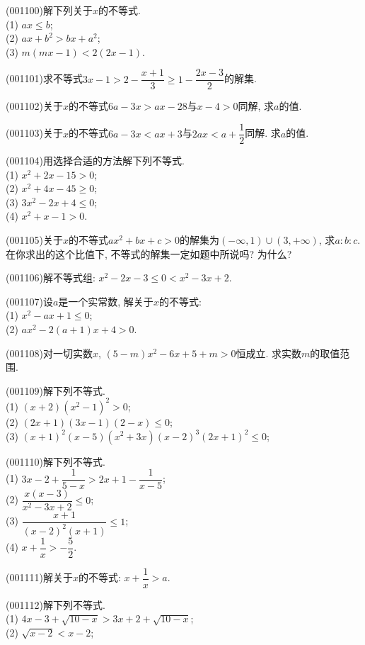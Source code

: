 \item (001100)解下列关于$x$的不等式.\\ 
(1) $ax\le b$;\\ 
(2) $ax+b^2>bx+a^2$;\\ 
(3) $m(mx-1)<2(2x-1)$.
\item (001101)求不等式$3x-1>2-\dfrac{x+1}{3}\ge 1-\dfrac{2x-3}{2}$的解集.
\item (001102)关于$x$的不等式$6a-3x>ax-28$与$x-4>0$同解, 求$a$的值.
\item (001103)关于$x$的不等式$6a-3x<ax+3$与$2ax<a+\dfrac{1}{2}$同解. 求$a$的值.
\item (001104)用选择合适的方法解下列不等式.\\ 
(1) $x^2+2x-15>0$;\\ 
(2) $x^2+4x-45\ge 0$;\\ 
(3) $3x^2-2x+4\le0$;\\ 
(4) $x^2+x-1>0$.
\item (001105)关于$x$的不等式$ax^2+bx+c>0$的解集为$(-\infty,1)\cup (3,+\infty)$, 求$a:b:c$. 在你求出的这个比值下, 不等式的解集一定如题中所说吗? 为什么?
\item (001106)解不等式组: $x^2-2x-3\le 0<x^2-3x+2$.
\item (001107)设$a$是一个实常数, 解关于$x$的不等式:\\ 
(1) $x^2-ax+1\le 0$;\\ 
(2) $ax^2-2(a+1)x+4>0$.
\item (001108)对一切实数$x$, $(5-m)x^2-6x+5+m>0$恒成立. 求实数$m$的取值范围.
\item (001109)解下列不等式.\\ 
(1) $(x+2)(x^2-1)^2>0$;\\ 
(2) $(2x+1)(3x-1)(2-x)\le 0$;\\ 
(3) $(x+1)^2(x-5)(x^2+3x)(x-2)^3(2x+1)^2\le 0$;
\item (001110)解下列不等式.\\ 
(1) $3x-2+\dfrac{1}{5-x}>2x+1-\dfrac{1}{x-5}$;\\ 
(2) $\dfrac{x(x-3)}{x^2-3x+2}\le0$;\\ 
(3) $\dfrac{x+1}{(x-2)^2(x+1)}\le1$;\\ 
(4) $x+\dfrac 1x>-\dfrac 52$.
\item (001111)解关于$x$的不等式: $x+\dfrac 1x>a$.
\item (001112)解下列不等式.\\ 
(1) $4x-3+\sqrt{10-x}>3x+2+\sqrt{10-x}$;\\ 
(2) $\sqrt{x-2}<x-2$;\\ 
